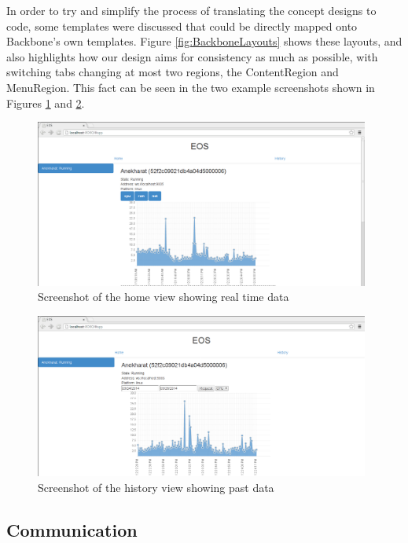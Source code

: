 \documentclass{l3proj}
\begin{document}
In order to try and simplify the process of translating the concept designs to code, some templates were discussed that could be directly mapped onto Backbone's own templates. Figure \ref{fig:BackboneLayouts} shows these layouts, and also highlights how our design aims for consistency as much as possible, with switching tabs changing at most two regions, the ContentRegion and MenuRegion. This fact can be seen in the two example screenshots shown in Figures \ref{fig:Real-time data} and \ref{fig:History data}.

\begin{figure}[H]
\centering
\includegraphics[width=110mm]{images/1.png}
\caption{Screenshot of the home view showing real time data}
\label{fig:Real-time data}
\end{figure}

\begin{figure}[H]
\centering
\includegraphics[width=110mm]{images/5.png}
\caption{Screenshot of the history view showing past data}
\label{fig:History data}
\end{figure}

\subsection{Communication}
\end{document}

